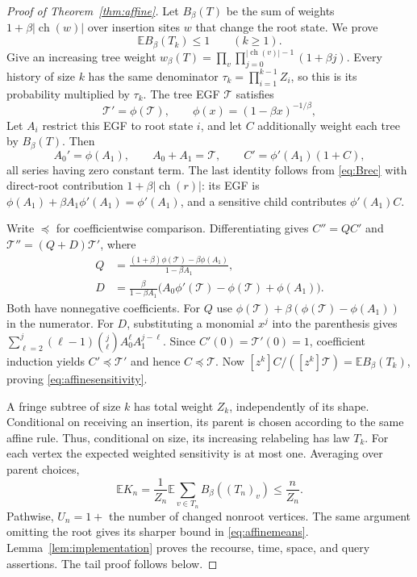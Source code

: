 \documentclass[runningheads,envcountsame,orivec]{llncs}
\newcommand{\E}{\mathbb E}
\newcommand{\ch}{\operatorname{ch}}
\begin{document}
\begin{proof}[Proof of Theorem~\ref{thm:affine}]
Let $B_\beta(T)$ be the sum of weights
$1+\beta\lvert\ch(w)\rvert$ over insertion sites $w$ that change the
root state. We prove
\begin{equation}\label{eq:affinesensitivity}
 \E B_\beta(T_k)\le1\qquad(k\ge1).
\end{equation}
Give an increasing tree weight
$w_\beta(T)=\prod_v\prod_{j=0}^{|\ch(v)|-1}(1+\beta j)$.
Every history of size $k$ has the same denominator
$\tau_k=\prod_{i=1}^{k-1}Z_i$, so this is its probability multiplied
by $\tau_k$. The tree EGF $\mathcal T$ satisfies
\[
 \mathcal T'=\phi(\mathcal T),\qquad
 \phi(x)=(1-\beta x)^{-1/\beta},
\]
Let $A_i$ restrict this EGF to
root state $i$, and let $C$ additionally weight each tree by
$B_\beta(T)$. Then
\begin{equation}\label{eq:affineodes}
 A_0'=\phi(A_1),\qquad A_0+A_1=\mathcal T,\qquad
 C'=\phi'(A_1)(1+C),
\end{equation}
all series having zero constant term. The last identity follows from
\eqref{eq:Brec} with direct-root contribution
$1+\beta|\ch(r)|$: its EGF is
$\phi(A_1)+\beta A_1\phi'(A_1)=\phi'(A_1)$, and a sensitive child
contributes $\phi'(A_1)C$.

Write $\preceq$ for coefficientwise comparison. Differentiating gives
$C''=Q C'$ and $\mathcal T''=(Q+D)\mathcal T'$, where
\begin{align*}
 Q&=\frac{(1+\beta)\phi(\mathcal T)-\beta\phi(A_1)}{1-\beta A_1},\\
 D&=\frac{\beta}{1-\beta A_1}
       \bigl(A_0\phi'(\mathcal T)-\phi(\mathcal T)+\phi(A_1)\bigr).
\end{align*}
Both have nonnegative coefficients. For $Q$ use
$\phi(\mathcal T)+\beta(\phi(\mathcal T)-\phi(A_1))$ in the numerator.
For $D$, substituting a monomial $x^j$ into the parenthesis gives
$\sum_{\ell=2}^j(\ell-1)\binom j\ell A_0^\ell A_1^{j-\ell}$.
Since $C'(0)=\mathcal T'(0)=1$, coefficient induction yields
$C'\preceq\mathcal T'$ and hence $C\preceq\mathcal T$.
Now $[z^k]C/([z^k]\mathcal T)=\E B_\beta(T_k)$, proving
\eqref{eq:affinesensitivity}. 

A fringe subtree of size $k$ has total weight $Z_k$, independently
of its shape. Conditional on receiving an insertion, its parent is
chosen according to the same affine rule. Thus, conditional on size,
its increasing relabeling has law $T_k$. For each vertex the expected
weighted sensitivity is at most one. Averaging over parent choices,
\[
 \E K_n=\frac1{Z_n}\E\sum_{v\in T_n}B_\beta((T_n)_v)
 \le\frac n{Z_n}.
\]
Pathwise, $U_n=1+$ the number of changed nonroot vertices. The same
argument omitting the root gives its sharper bound in
\eqref{eq:affinemeans}. Lemma~\ref{lem:implementation} proves the
recourse, time, space, and query assertions. The tail proof follows below.
\end{proof}
\end{document}
